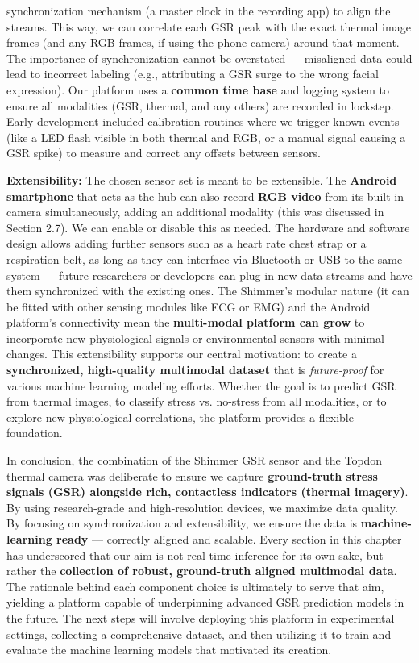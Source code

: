 synchronization mechanism (a master clock in the recording app) to align
the streams. This way, we can correlate each GSR peak with the exact
thermal image frames (and any RGB frames, if using the phone camera)
around that moment. The importance of synchronization cannot be
overstated --- misaligned data could lead to incorrect labeling (e.g.,
attributing a GSR surge to the wrong facial expression). Our platform
uses a \textbf{common time base} and logging system to ensure all modalities
(GSR, thermal, and any others) are recorded in lockstep. Early
development included calibration routines where we trigger known events
(like a LED flash visible in both thermal and RGB, or a manual signal
causing a GSR spike) to measure and correct any offsets between sensors.

\textbf{Extensibility:} The chosen sensor set is meant to be extensible. The
\textbf{Android smartphone} that acts as the hub can also record \textbf{RGB
video} from its built-in camera simultaneously, adding an additional
modality (this was discussed in Section 2.7). We can enable or disable
this as needed. The hardware and software design allows adding further
sensors such as a heart rate chest strap or a respiration belt, as long
as they can interface via Bluetooth or USB to the same system --- future
researchers or developers can plug in new data streams and have them
synchronized with the existing ones. The Shimmer's modular nature (it
can be fitted with other sensing modules like ECG or EMG) and the
Android platform's connectivity mean the \textbf{multi-modal platform can
grow} to incorporate new physiological signals or environmental sensors
with minimal changes. This extensibility supports our central
motivation: to create a \textbf{synchronized, high-quality multimodal
dataset} that is \textit{future-proof} for various machine learning modeling
efforts. Whether the goal is to predict GSR from thermal images, to
classify stress vs. no-stress from all modalities, or to explore new
physiological correlations, the platform provides a flexible foundation.

In conclusion, the combination of the Shimmer GSR sensor and the Topdon
thermal camera was deliberate to ensure we capture \textbf{ground-truth stress
signals (GSR) alongside rich, contactless indicators (thermal
imagery)}. By using research-grade and high-resolution devices, we
maximize data quality. By focusing on synchronization and extensibility,
we ensure the data is \textbf{machine-learning ready} --- correctly aligned
and scalable. Every section in this chapter has underscored that our aim
is not real-time inference for its own sake, but rather the \textbf{collection
of robust, ground-truth aligned multimodal data}. The rationale behind
each component choice is ultimately to serve that aim, yielding a
platform capable of underpinning advanced GSR prediction models in the
future. The next steps will involve deploying this platform in
experimental settings, collecting a comprehensive dataset, and then
utilizing it to train and evaluate the machine learning models that
motivated its creation.


